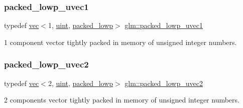 \subsubsection{\texorpdfstring{packed\+\_\+lowp\+\_\+uvec1}{packed\_lowp\_uvec1}}
{\footnotesize\ttfamily typedef \mbox{\hyperlink{structglm_1_1vec}{vec}}$<$1, \mbox{\hyperlink{group__core__precision_ga4fd29415871152bfb5abd588334147c8}{uint}}, \mbox{\hyperlink{namespaceglm_a36ed105b07c7746804d7fdc7cc90ff25ac36a4bd74559be2c0b65bc48e5953b8b}{packed\+\_\+lowp}}$>$ \mbox{\hyperlink{group__gtc__type__aligned_ga992b281fc2e3bf15c09f491393045ebc}{glm\+::packed\+\_\+lowp\+\_\+uvec1}}}



1 component vector tightly packed in memory of unsigned integer numbers. 

\mbox{\label{group__gtc__type__aligned_ga48ab6ca01a9d2418365ca7c3ea1183e8}} 
\subsubsection{\texorpdfstring{packed\+\_\+lowp\+\_\+uvec2}{packed\_lowp\_uvec2}}
{\footnotesize\ttfamily typedef \mbox{\hyperlink{structglm_1_1vec}{vec}}$<$2, \mbox{\hyperlink{group__core__precision_ga4fd29415871152bfb5abd588334147c8}{uint}}, \mbox{\hyperlink{namespaceglm_a36ed105b07c7746804d7fdc7cc90ff25ac36a4bd74559be2c0b65bc48e5953b8b}{packed\+\_\+lowp}}$>$ \mbox{\hyperlink{group__gtc__type__aligned_ga48ab6ca01a9d2418365ca7c3ea1183e8}{glm\+::packed\+\_\+lowp\+\_\+uvec2}}}



2 components vector tightly packed in memory of unsigned integer numbers. 

\mbox{\label{group__gtc__type__aligned_ga895469f176463355d8b0a4bd8a4eaf45}} 
